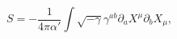 \begin{equation}
S = -\frac{1}{4 \pi \alpha'}  \int \sqrt{-\gamma} \gamma^{ab}
\partial_a X^\mu \partial_b X_\mu,
\label{eq:string-action}
\end{equation}

